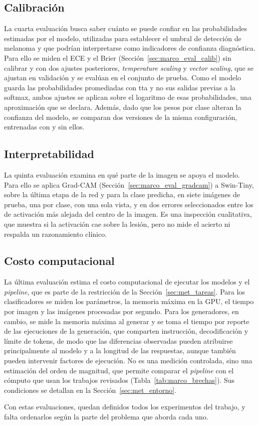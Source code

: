 \subsection{Calibración}
\label{sec:met_calibracion}

La cuarta evaluación busca saber cuánto se puede confiar en las probabilidades estimadas por el modelo, utilizadas para establecer el umbral de detección de melanoma y que podrían interpretarse como indicadores de confianza diagnóstica. Para ello se miden el ECE y el Brier
(Sección~\ref{sec:marco_eval_calib}) sin calibrar y con dos ajustes posteriores, \emph{temperature scaling} y
\emph{vector scaling}, que se ajustan en validación y se evalúan en el conjunto de prueba. Como el modelo guarda las
probabilidades promediadas con \gls{tta} y no sus salidas previas a la softmax, ambos ajustes se aplican sobre el
logaritmo de esas probabilidades, una aproximación que se declara. Además, dado que los pesos por clase alteran la
confianza del modelo, se comparan dos versiones de la misma configuración, entrenadas con y sin ellos.

\subsection{Interpretabilidad}
\label{sec:met_interpretabilidad}

La quinta evaluación examina en qué parte de la imagen se apoya el modelo. Para ello se aplica Grad-CAM
(Sección~\ref{sec:marco_eval_gradcam}) a Swin-Tiny, sobre la última etapa de la red y para la clase predicha, en siete imágenes de prueba, una por clase, con una sola vista, y en dos errores seleccionados entre los de activación
más alejada del centro de la imagen. Es una inspección cualitativa, que muestra si la activación cae sobre la lesión,
pero no mide el acierto ni respalda un razonamiento clínico.

\subsection{Costo computacional}
\label{sec:met_costo}

La última evaluación estima el costo computacional de ejecutar los modelos y el \emph{pipeline}, que es parte de la
restricción de la Sección~\ref{sec:met_tareas}. Para los clasificadores se miden los parámetros, la memoria máxima en
la GPU, el tiempo por imagen y las imágenes procesadas por segundo. Para los generadores, en cambio, se mide la memoria máxima al generar y se toma el tiempo por reporte de las ejecuciones
de la generación, que comparten instrucción, decodificación y límite de tokens,
de modo que las diferencias observadas pueden atribuirse principalmente al modelo y a la longitud de las respuestas, aunque también pueden intervenir factores de ejecución. No es una medición controlada, sino una
estimación del orden de magnitud, que permite comparar el \emph{pipeline} con el cómputo que usan los trabajos
revisados (Tabla~\ref{tab:marco_brechas}). Sus condiciones se detallan en
la Sección~\ref{sec:met_entorno}.

Con estas evaluaciones, quedan definidos todos los experimentos del trabajo, y falta ordenarlos según la parte del
problema que aborda cada uno.

